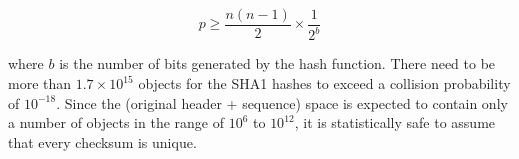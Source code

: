 \begin{equation}
p \ge \frac{n (n-1)}{2} \times \frac{1}{2^b}
\label{eq:hashcollision}
\end{equation}

where $b$ is the number of bits generated by the hash function. There need to be
more than $1.7 \times 10^{15}$ objects for the SHA1 hashes to exceed a collision
probability of $10^{-18}$. Since the (original header + sequence) space is
expected to contain only a number of objects in the range of $10^6$ to
$10^{12}$, it is statistically safe to assume that every checksum is unique. 
